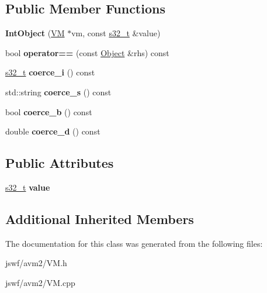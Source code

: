 \subsection*{Public Member Functions}
\begin{DoxyCompactItemize}
\item 
\hypertarget{classjswf_1_1avm2_1_1_int_object_abdc469f3a9c5d5c577577edc4d690105}{{\bfseries Int\+Object} (\hyperlink{classjswf_1_1avm2_1_1_v_m}{V\+M} $\ast$vm, const \hyperlink{namespacejswf_a19b2a5980fe3b05994a2127a3c7e0521}{s32\+\_\+t} \&value)}\label{classjswf_1_1avm2_1_1_int_object_abdc469f3a9c5d5c577577edc4d690105}

\item 
\hypertarget{classjswf_1_1avm2_1_1_int_object_ae079a372c70b2a76a7c856c7cb4b8fe5}{bool {\bfseries operator==} (const \hyperlink{classjswf_1_1avm2_1_1_object}{Object} \&rhs) const }\label{classjswf_1_1avm2_1_1_int_object_ae079a372c70b2a76a7c856c7cb4b8fe5}

\item 
\hypertarget{classjswf_1_1avm2_1_1_int_object_a62afc4206183a09a6d1666ead5428512}{\hyperlink{namespacejswf_a19b2a5980fe3b05994a2127a3c7e0521}{s32\+\_\+t} {\bfseries coerce\+\_\+i} () const }\label{classjswf_1_1avm2_1_1_int_object_a62afc4206183a09a6d1666ead5428512}

\item 
\hypertarget{classjswf_1_1avm2_1_1_int_object_a27318df92de47a6518e63b6ff18f0985}{std\+::string {\bfseries coerce\+\_\+s} () const }\label{classjswf_1_1avm2_1_1_int_object_a27318df92de47a6518e63b6ff18f0985}

\item 
\hypertarget{classjswf_1_1avm2_1_1_int_object_ae61ecc969e3213ff2ed67e4c8086b688}{bool {\bfseries coerce\+\_\+b} () const }\label{classjswf_1_1avm2_1_1_int_object_ae61ecc969e3213ff2ed67e4c8086b688}

\item 
\hypertarget{classjswf_1_1avm2_1_1_int_object_a0e7d8c497e3d6289b02bb2b6cef3659c}{double {\bfseries coerce\+\_\+d} () const }\label{classjswf_1_1avm2_1_1_int_object_a0e7d8c497e3d6289b02bb2b6cef3659c}

\end{DoxyCompactItemize}
\subsection*{Public Attributes}
\begin{DoxyCompactItemize}
\item 
\hypertarget{classjswf_1_1avm2_1_1_int_object_a756a29b8338bc0851d33d7a610ba0404}{\hyperlink{namespacejswf_a19b2a5980fe3b05994a2127a3c7e0521}{s32\+\_\+t} {\bfseries value}}\label{classjswf_1_1avm2_1_1_int_object_a756a29b8338bc0851d33d7a610ba0404}

\end{DoxyCompactItemize}
\subsection*{Additional Inherited Members}


The documentation for this class was generated from the following files\+:\begin{DoxyCompactItemize}
\item 
jswf/avm2/V\+M.\+h\item 
jswf/avm2/V\+M.\+cpp\end{DoxyCompactItemize}
